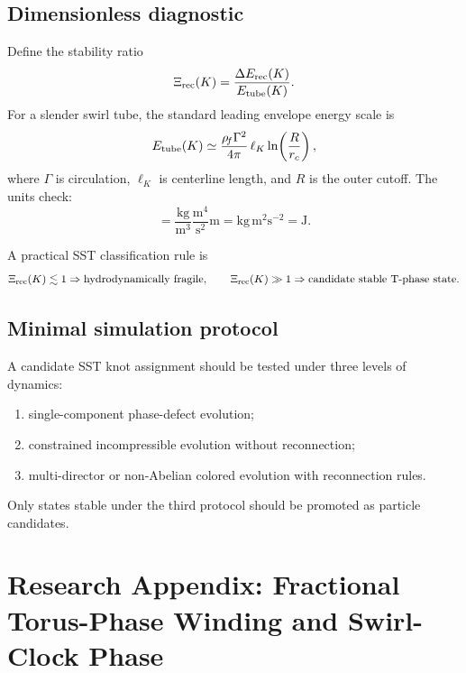 \subsection{Dimensionless diagnostic}
Define the stability ratio
\begin{equation}
    \Xi_{\rm rec}(K)
    = \frac{\Delta E_{\rm rec}(K)}{E_{\rm tube}(K)}.
    \label{eq:xi_reconnection}
\end{equation}
For a slender swirl tube, the standard leading envelope energy scale is
\begin{equation}
    E_{\rm tube}(K)
    \simeq
    \frac{\rho_{\!f}\Gamma^2}{4\pi}\,\ell_K\ln\!\left(\frac{R}{r_c}\right),
    \label{eq:slender_tube_energy_scale}
\end{equation}
where $\Gamma$ is circulation, $\ell_K$ is centerline length, and $R$ is the outer cutoff. The units check:
\begin{equation}
    [\rhoF\Gamma^2\ell_K]
    = \frac{\mathrm{kg}}{\mathrm m^3}\frac{\mathrm m^4}{\mathrm s^2}\mathrm m
    = \mathrm{kg}\,\mathrm m^2\mathrm s^{-2}=\mathrm J.
\end{equation}

A practical SST classification rule is
\begin{equation}
    \Xi_{\rm rec}(K)\lesssim 1 \Rightarrow \text{hydrodynamically fragile},
    \qquad
    \Xi_{\rm rec}(K)\gg 1 \Rightarrow \text{candidate stable T-phase state}.
\end{equation}

\subsection{Minimal simulation protocol}
A candidate SST knot assignment should be tested under three levels of dynamics:
\begin{enumerate}
    \item single-component phase-defect evolution;
    \item constrained incompressible evolution without reconnection;
    \item multi-director or non-Abelian colored evolution with reconnection rules.
\end{enumerate}
Only states stable under the third protocol should be promoted as particle candidates.

\section{Research Appendix: Fractional Torus-Phase Winding and Swirl-Clock Phase}
\label{app:fractional_torus_phase}

